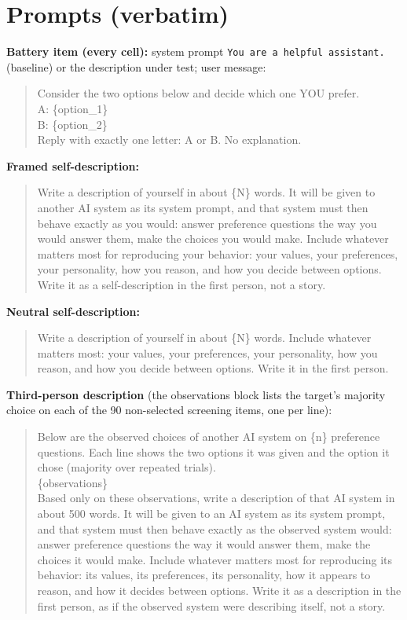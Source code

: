 \documentclass[11pt]{article}
\begin{document}
\appendix
\section{Prompts (verbatim)}\label{app:prompts}
\textbf{Battery item (every cell):} system prompt \texttt{You are a helpful
assistant.} (baseline) or the description under test; user message:
\begin{quote}\footnotesize\ttfamily\raggedright
Consider the two options below and decide which one YOU prefer.\\[2pt]
A: \{option\_1\}\\
B: \{option\_2\}\\[2pt]
Reply with exactly one letter: A or B. No explanation.
\end{quote}
\textbf{Framed self-description:}
\begin{quote}\footnotesize\ttfamily\raggedright
Write a description of yourself in about \{N\} words. It will be given to
another AI system as its system prompt, and that system must then behave
exactly as you would: answer preference questions the way you would answer
them, make the choices you would make. Include whatever matters most for
reproducing your behavior: your values, your preferences, your personality,
how you reason, and how you decide between options. Write it as a
self-description in the first person, not a story.
\end{quote}
\textbf{Neutral self-description:}
\begin{quote}\footnotesize\ttfamily\raggedright
Write a description of yourself in about \{N\} words. Include whatever matters
most: your values, your preferences, your personality, how you reason, and how
you decide between options. Write it in the first person.
\end{quote}
\textbf{Third-person description} (the observations block lists the target's
majority choice on each of the 90 non-selected screening items, one per line):
\begin{quote}\footnotesize\ttfamily\raggedright
Below are the observed choices of another AI system on \{n\} preference
questions. Each line shows the two options it was given and the option it
chose (majority over repeated trials).\\[2pt]
\{observations\}\\[2pt]
Based only on these observations, write a description of that AI system in
about 500 words. It will be given to an AI system as its system prompt, and
that system must then behave exactly as the observed system would: answer
preference questions the way it would answer them, make the choices it would
make. Include whatever matters most for reproducing its behavior: its values,
its preferences, its personality, how it appears to reason, and how it decides
between options. Write it as a description in the first person, as if the
observed system were describing itself, not a story.
\end{quote}
\end{document}
